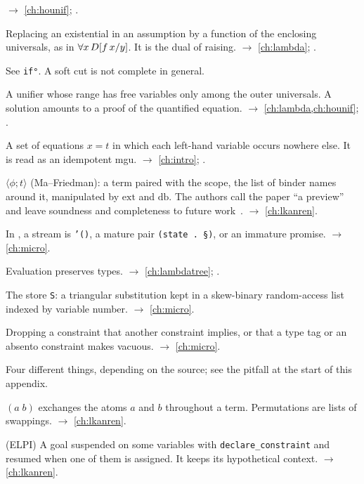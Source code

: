 \begin{glossarylist}
  $\rightarrow$ \cref{ch:hounif}; .
\item[Skolemization] Replacing an existential in an assumption by a function of the enclosing universals, as in
  $\forall x\,D[f\,x/y]$. It is the dual of raising. $\rightarrow$ \cref{ch:lambda}; .
\item[Soft cut] See \texttt{if°}. A soft cut is not complete in general.
\item[Solution] A unifier whose range has free variables only among the outer universals. A solution amounts to a
  proof of the quantified equation. $\rightarrow$ \cref{ch:lambda,ch:hounif}; .
\item[Solved form] A set of equations $x=t$ in which each left-hand variable occurs nowhere else. It is read as an
  idempotent mgu. $\rightarrow$ \cref{ch:intro}; .
\item[Static closure] $\langle\phi;t\rangle$ (Ma--Friedman): a term paired with the scope, the list of binder names
  around it, manipulated by $\mathrm{ext}$ and $\mathrm{db}$. The authors call the paper \enquote{a preview} and
  leave soundness and completeness to future work~\cite{MaFriedman2021}. $\rightarrow$ \cref{ch:lkanren}.
\item[Stream (\texttt{§})] In \aux{}, a stream is \texttt{'()}, a mature pair \texttt{(state\hbox{ }.\hbox{ }§)}, or an immature
  promise. $\rightarrow$ \cref{ch:micro}.
\item[Subject reduction] Evaluation preserves types. $\rightarrow$ \cref{ch:lambdatree}; .
\item[Substitution (\micro{})] The store \texttt{S}: a triangular substitution kept in a skew-binary random-access
  list indexed by variable number. $\rightarrow$ \cref{ch:micro}.
\item[Subsumption (\micro{})] Dropping a constraint that another constraint implies, or that a type tag or an
  absento constraint makes vacuous. $\rightarrow$ \cref{ch:micro}.
\item[Suspension] Four different things, depending on the source; see the pitfall at the start of this appendix.
\item[Swapping] $(a\;b)$ exchanges the atoms $a$ and $b$ throughout a term. Permutations are lists of swappings.
  $\rightarrow$ \cref{ch:lkanren}.
\item[Syntactic constraint] (ELPI) A goal suspended on some variables with \texttt{declare\_constraint} and resumed
  when one of them is assigned. It keeps its hypothetical context. $\rightarrow$ \cref{ch:lkanren}.
\end{glossarylist}

